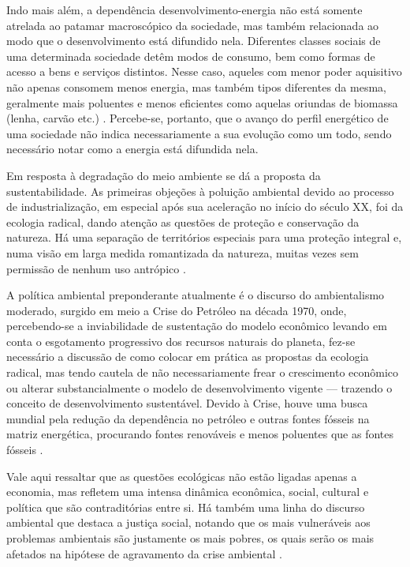 Indo mais além, a dependência desenvolvimento-energia não está somente
atrelada ao patamar macroscópico da sociedade, mas também relacionada
ao modo que o desenvolvimento está difundido nela. Diferentes classes
sociais de uma determinada sociedade detêm modos de consumo, bem como
formas de acesso a bens e serviços distintos. Nesse caso, aqueles com
menor poder aquisitivo não apenas consomem menos energia, mas também
tipos diferentes da mesma, geralmente mais poluentes e menos
eficientes como aquelas oriundas de biomassa (lenha, carvão etc.)
\cite{rippel}. Percebe-se, portanto, que o avanço do perfil energético
de uma sociedade não indica necessariamente a sua evolução como um
todo, sendo necessário notar como a energia está difundida nela.

Em resposta à degradação do meio ambiente se dá a proposta da
sustentabilidade. As primeiras objeções à poluição ambiental devido ao processo 
de industrialização, em especial após sua aceleração no início do século XX,
foi da ecologia radical, dando atenção as questões de proteção e conservação da natureza.
Há uma separação de territórios especiais para uma proteção integral e, numa
visão em larga medida romantizada da natureza, muitas vezes sem permissão 
de nenhum uso antrópico \cite{jatoba}.

A política ambiental preponderante atualmente é o discurso do ambientalismo moderado, 
surgido em meio a Crise do Petróleo na década 1970, onde, percebendo-se a
inviabilidade de sustentação do modelo econômico levando em conta o esgotamento
progressivo dos recursos naturais do planeta, fez-se necessário a discussão de como 
colocar em prática as propostas da ecologia radical, mas tendo cautela de não 
necessariamente frear o crescimento econômico ou alterar substancialmente o 
modelo de desenvolvimento vigente --- trazendo o conceito de desenvolvimento
sustentável. Devido à Crise, houve uma busca mundial pela redução da 
dependência no petróleo e outras fontes fósseis na matriz energética, 
procurando fontes renováveis e menos poluentes que as fontes fósseis 
\cite{jatoba,epe_eficiencia_2012,rippel}. 

Vale aqui ressaltar que as questões ecológicas não estão ligadas apenas a
economia, mas refletem uma intensa dinâmica econômica, social, cultural e política 
que são contraditórias entre si. Há também uma linha do discurso ambiental que destaca a
justiça social, notando que os mais vulneráveis aos problemas
ambientais são justamente os mais pobres, os quais serão os mais afetados na
hipótese de agravamento da crise ambiental \cite{jatoba}.

